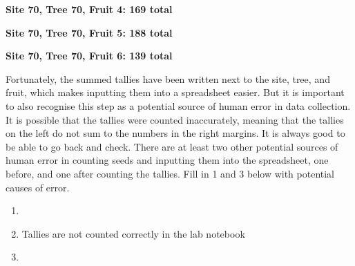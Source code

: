 \documentclass[
  openany]{krantz}
\providecommand{\tightlist}{%
  \setlength{\itemsep}{0pt}\setlength{\parskip}{0pt}}
\begin{document}
\textbf{Site 70, Tree 70, Fruit 4: 169 total}

\StrokeFive\StrokeFive\StrokeFive\StrokeFive\StrokeFive\StrokeFive\StrokeFive\StrokeFive\StrokeFive\StrokeFive\StrokeFive\StrokeFive\StrokeFive\StrokeFive\StrokeFive\StrokeFive\StrokeFive\StrokeFive\StrokeFive\StrokeFive

\StrokeFive\StrokeFive\StrokeFive\StrokeFive\StrokeFive\StrokeFive\StrokeFive\StrokeFive\StrokeFive\StrokeFive\StrokeFive\StrokeFive\StrokeFive\StrokeFour

\textbf{Site 70, Tree 70, Fruit 5: 188 total}

\StrokeFive\StrokeFive\StrokeFive\StrokeFive\StrokeFive\StrokeFive\StrokeFive\StrokeFive\StrokeFive\StrokeFive\StrokeFive\StrokeFive\StrokeFive\StrokeFive\StrokeFive\StrokeFive\StrokeFive\StrokeFive\StrokeFive\StrokeFive

\StrokeFive\StrokeFive\StrokeFive\StrokeFive\StrokeFive\StrokeFive\StrokeFive\StrokeFive\StrokeFive\StrokeFive\StrokeFive\StrokeFive\StrokeFive\StrokeFive\StrokeFive\StrokeFive\StrokeFive\StrokeThree

\textbf{Site 70, Tree 70, Fruit 6: 139 total}

\StrokeFive\StrokeFive\StrokeFive\StrokeFive\StrokeFive\StrokeFive\StrokeFive\StrokeFive\StrokeFive\StrokeFive\StrokeFive\StrokeFive\StrokeFive\StrokeFive\StrokeFive\StrokeFive\StrokeFive\StrokeFive\StrokeFive\StrokeFive

\StrokeFive\StrokeFive\StrokeFive\StrokeFive\StrokeFive\StrokeFive\StrokeFive\StrokeFour

Fortunately, the summed tallies have been written next to the site, tree, and fruit, which makes inputting them into a spreadsheet easier.
But it is important to also recognise this step as a potential source of human error in data collection.
It is possible that the tallies were counted inaccurately, meaning that the tallies on the left do not sum to the numbers in the right margins.
It is always good to be able to go back and check.
There are at least two other potential sources of human error in counting seeds and inputting them into the spreadsheet, one before, and one after counting the tallies.
Fill in 1 and 3 below with potential causes of error.

\begin{enumerate}
\def\labelenumi{\arabic{enumi}.}
\tightlist
\item
\item
  Tallies are not counted correctly in the lab notebook
\item
\end{enumerate}
\end{document}
